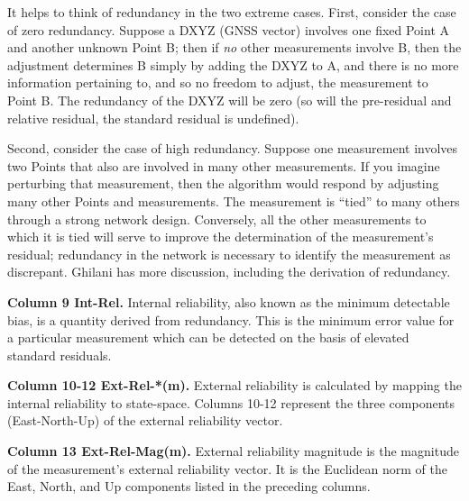 It helps to think of redundancy in the two extreme cases. First, consider the case of zero redundancy. Suppose a DXYZ (GNSS vector) involves one fixed Point A and another unknown Point B; then if \emph{no} other measurements involve B, then the adjustment determines B simply by adding the DXYZ to A, and there is no more information pertaining to, and so no freedom to adjust, the measurement to Point B. The redundancy of the DXYZ will be zero (so will the pre-residual and relative residual, the standard residual is undefined).

Second, consider the case of high redundancy. Suppose one measurement involves two Points that also are involved in many other measurements. If you imagine perturbing that measurement, then the algorithm would respond by adjusting many other Points and measurements. The measurement is ``tied'' to many others through a strong network design. Conversely, all the other measurements to which it is tied will serve to improve the determination of the measurement's residual; redundancy in the network is necessary to identify the measurement as discrepant. Ghilani \cite{ghilani} has more discussion, including the derivation of redundancy.

\textbf{Column 9 Int-Rel.} Internal reliability, also known as the minimum detectable bias, is a quantity derived from redundancy. This is the minimum error value for a particular measurement which can be detected on the basis of elevated standard residuals.

\textbf{Column 10-12 Ext-Rel-*(m).} External reliability is calculated by mapping the internal reliability to state-space. Columns 10-12 represent the three components (East-North-Up) of the external reliability vector. 
 
\textbf{Column 13 Ext-Rel-Mag(m).} External reliability magnitude is the magnitude of the measurement's external reliability vector.  It is the Euclidean norm of the East, North, and Up components listed in the preceding columns.

